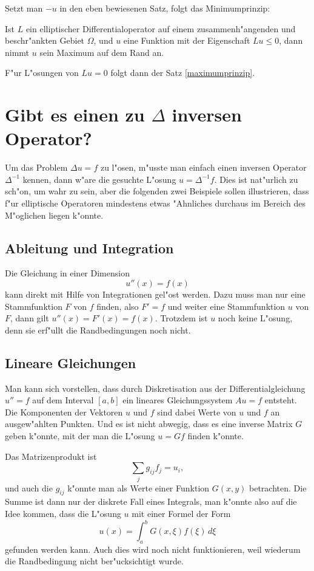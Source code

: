 {Setzt man $-u$ in den eben bewiesenen Satz, folgt das Minimumprinzip:
\begin{satz}
Ist $L$ ein elliptischer Differentialoperator auf einem zusammenh"angenden
und beschr"ankten Gebiet $\Omega$,
und $u$ eine Funktion mit der Eigenschaft $Lu\le0$,
dann nimmt $u$ sein Maximum auf dem Rand an.
\end{satz}

F"ur L"osungen von $Lu=0$ folgt dann der Satz \ref{maximumprinzip}.
}

\section{Gibt es einen zu $\Delta$ inversen Operator?}
Um das Problem $\Delta u=f$ zu l"osen, m"usste man einfach einen
inversen Operator $\Delta^{-1}$ kennen, dann w"are die gesuchte
L"osung $u=\Delta^{-1}f$. Dies ist nat"urlich zu sch"on, um wahr
zu sein, aber die folgenden zwei Beispiele sollen illustrieren,
dass f"ur elliptische Operatoren
mindestens etwas "Ahnliches durchaus im Bereich des M"oglichen
liegen k"onnte.

\subsection{Ableitung und Integration}
Die Gleichung in einer Dimension
\[
u''(x)=f(x)
\]
kann direkt mit Hilfe von Integrationen gel"ost werden. Dazu muss
man nur eine Stammfunktion $F$ von $f$ finden, also $F' = f$ und
weiter eine Stammfunktion $u$ von $F$, dann gilt
$u''(x)=F'(x)=f(x)$. Trotzdem ist $u$ noch keine L"osung, denn 
sie erf"ullt die Randbedingungen noch nicht.

\subsection{Lineare Gleichungen}
Man kann sich vorstellen, dass durch Diskretisation aus der 
Differentialgleichung $u''=f$ auf dem Interval $[a,b]$ ein lineares Gleichungssystem
$Au=f$ entsteht. Die Komponenten der Vektoren $u$ und $f$ sind dabei
Werte von $u$ und $f$ an ausgew"ahlten Punkten. Und es ist nicht
abwegig, dass es eine inverse Matrix $G$ geben k"onnte, mit der man
die L"osung $u=Gf$ finden k"onnte.

Das Matrizenprodukt ist
\[
\sum_{j}g_{ij}f_j = u_i,
\]
und auch die $g_{ij}$ k"onnte man als Werte einer Funktion $G(x,y)$
betrachten. Die Summe ist dann nur der diskrete Fall eines Integrals,
man k"onnte also auf die Idee kommen, dass
die L"osung $u$ mit einer Formel der Form
\[
u(x)=\int_a^b G(x,\xi)f(\xi)\,d\xi
\]
gefunden werden kann. Auch dies wird noch nicht funktionieren,
weil wiederum die Randbedingung nicht ber"ucksichtigt wurde.

